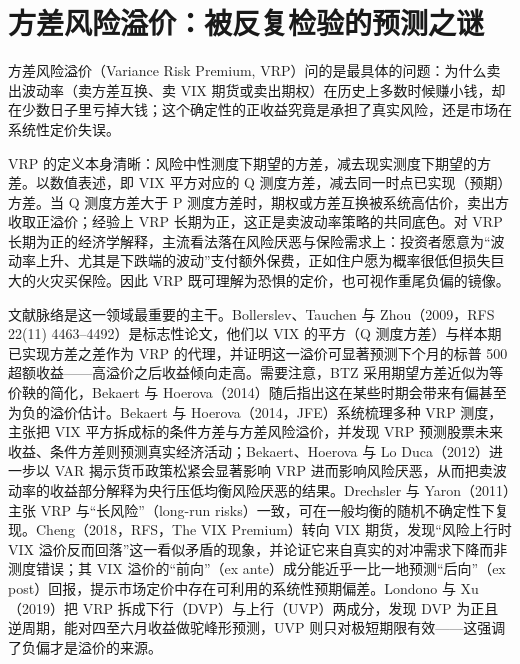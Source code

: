 \documentclass[11pt,a4paper]{ctexart}
\begin{document}
\section{方差风险溢价：被反复检验的预测之谜}

方差风险溢价（Variance Risk Premium, VRP）问的是最具体的问题：为什么卖出波动率（卖方差互换、卖 VIX 期货或卖出期权）在历史上多数时候赚小钱，却在少数日子里亏掉大钱；这个确定性的正收益究竟是承担了真实风险，还是市场在系统性定价失误。

VRP 的定义本身清晰：风险中性测度下期望的方差，减去现实测度下期望的方差。以数值表述，即 VIX 平方对应的 Q 测度方差，减去同一时点已实现（预期）方差。当 Q 测度方差大于 P 测度方差时，期权或方差互换被系统高估价，卖出方收取正溢价；经验上 VRP 长期为正，这正是卖波动率策略的共同底色。对 VRP 长期为正的经济学解释，主流看法落在风险厌恶与保险需求上：投资者愿意为“波动率上升、尤其是下跌端的波动”支付额外保费，正如住户愿为概率很低但损失巨大的火灾买保险。因此 VRP 既可理解为恐惧的定价，也可视作重尾负偏的镜像。

文献脉络是这一领域最重要的主干。Bollerslev、Tauchen 与 Zhou（2009，RFS 22(11) 4463–4492）是标志性论文，他们以 VIX 的平方（Q 测度方差）与样本期已实现方差之差作为 VRP 的代理，并证明这一溢价可显著预测下个月的标普 500 超额收益——高溢价之后收益倾向走高。需要注意，BTZ 采用期望方差近似为等价鞅的简化，Bekaert 与 Hoerova（2014）随后指出这在某些时期会带来有偏甚至为负的溢价估计。Bekaert 与 Hoerova（2014，JFE）系统梳理多种 VRP 测度，主张把 VIX 平方拆成标的条件方差与方差风险溢价，并发现 VRP 预测股票未来收益、条件方差则预测真实经济活动；Bekaert、Hoerova 与 Lo Duca（2012）进一步以 VAR 揭示货币政策松紧会显著影响 VRP 进而影响风险厌恶，从而把卖波动率的收益部分解释为央行压低均衡风险厌恶的结果。Drechsler 与 Yaron（2011）主张 VRP 与“长风险”（long-run risks）一致，可在一般均衡的随机不确定性下复现。Cheng（2018，RFS，The VIX Premium）转向 VIX 期货，发现“风险上行时 VIX 溢价反而回落”这一看似矛盾的现象，并论证它来自真实的对冲需求下降而非测度错误；其 VIX 溢价的“前向”（ex ante）成分能近乎一比一地预测“后向”（ex post）回报，提示市场定价中存在可利用的系统性预期偏差。Londono 与 Xu（2019）把 VRP 拆成下行（DVP）与上行（UVP）两成分，发现 DVP 为正且逆周期，能对四至六月收益做驼峰形预测，UVP 则只对极短期限有效——这强调了负偏才是溢价的来源。
\end{document}
